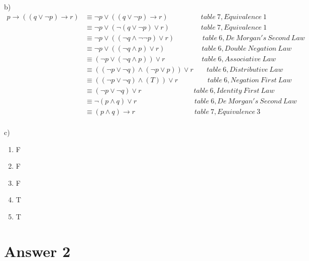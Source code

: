 \documentclass[12pt]{article}
\begin{document}
b)\\
\begin{equation*}
\begin{split}
 p \rightarrow ((q \vee \neg p) \rightarrow r) &
 \equiv \neg p \vee ((q \vee \neg p) \rightarrow r)\  \ \qquad \quad\quad \ table\ 7, Equivalence \ 1\\
 &
 \equiv \neg p \vee (\neg(q \vee \neg p) \vee r)\ \  \quad \quad \quad\quad table\ 7, Equivalence\ 1\\
 &
 \equiv \neg p \vee ((\neg q \wedge \neg \neg p) \vee r) \quad \quad\quad \quad  table\ 6, De\ Morgan's\ Second\ Law\\ &
 \equiv \neg p \vee ((\neg q \wedge  p) \vee r) \quad \quad \quad \quad\quad\ table\ 6, Double\  Negation\ Law\\ &
 \equiv (\neg p \vee (\neg q \wedge  p)) \vee r \quad \quad \quad \quad\quad\ table\ 6, Associative\ Law\\ &
 \equiv ((\neg p \vee \neg q) \wedge(\neg p  \vee  p)) \vee r \quad \ \ \ \  table\ 6, Distributive \ Law\\ &
 \equiv ((\neg p \vee \neg q) \wedge(T)) \vee r \quad \quad \quad \quad \ table\ 6, Negation \ First \ Law\\ &
 \equiv (\neg p \vee \neg q)  \vee r \quad \quad \quad\quad\quad\quad\quad\ \ table\ 6, Identity\ First\ Law\\ &
 \equiv \neg( p \wedge  q)  \vee r \quad \quad \quad \quad\quad\quad\quad\quad\ table\ 6, De\ Morgan's\ Second\ Law\\ &
 \equiv ( p \wedge  q)  \rightarrow r \quad \quad \quad \quad\quad\quad\quad\quad \ \ table\ 7, Equivalence\ 3\\
\end{split}
\end{equation*}

c)\\


\begin{enumerate}
\centering
    \item F
    \item F
    \item F
    \item T
    \item T
\end{enumerate}

\section*{Answer 2}
\end{document}
